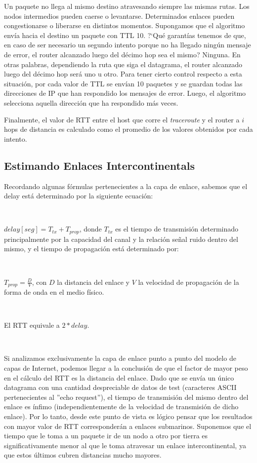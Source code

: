 Un paquete no llega al mismo destino atravesando siempre las mismas rutas. Los nodos intermedios pueden
caerse o levantarse. Determinados enlaces pueden congestionarse o liberarse en distintos momentos.
Supongamos que el algoritmo env\'ia hacia el destino un paquete con TTL 10. ?`Qu\'e garant\'ias tenemos de que,
en caso de ser necesario un segundo intento porque no ha llegado ning\'un mensaje de error, el router
alcanzado luego del d\'ecimo hop sea el mismo? Ninguna. En otras palabras, dependiendo la ruta que siga
el datagrama, el router alcanzado luego del d\'ecimo hop ser\'a uno u otro.
Para tener cierto control respecto a esta situaci\'on, por cada valor de TTL se env\'ian 10 paquetes y
se guardan todas las direcciones de IP que han respondido los mensajes de error.
Luego, el algoritmo selecciona aquella direcci\'on que ha respondido m\'as veces.

Finalmente, el valor de RTT entre el host que corre el \emph{traceroute} y el router a $i$ hops de
distancia es calculado como el promedio de los valores obtenidos por cada intento.


\subsection{Estimando Enlaces Intercontinentals}

Recordando algunas f\'ormulas pertenecientes a la capa de enlace, sabemos que el delay est\'a determinado
por la siguiente ecuaci\'on:

~

$delay[seg] = T_{tx} + T_{prop}$, donde $T_{tx}$ es el tiempo de transmisi\'on determinado principalmente
por la capacidad del canal y la relaci\'on se\~nal ruido dentro del mismo, y el tiempo de propagaci\'on
est\'a determinado por:

~

$T_{prop} = \frac{D}{V}$, con $D$ la distancia del enlace y $V$ la velocidad de propagaci\'on de la forma
de onda en el medio f\'isico.

~

El RTT equivale a $2*delay$.

~

Si analizamos exclusivamente la capa de enlace punto a punto del modelo de capas de Internet, podemos
llegar a la conclusi\'on de que el factor de mayor peso en el c\'alculo del RTT es la distancia del enlace.
Dado que se env\'ia un \'unico datagrama con una cantidad despreciable de datos de test (caracteres
ASCII pertenecientes al ''echo request''), el tiempo de transmisi\'on del mismo dentro del enlace es
\'infimo (independientemente de la velocidad de transmisi\'on de dicho enlace). Por lo tanto, desde este
punto de vista es l\'ogico pensar que los resultados con mayor valor de RTT corresponder\'an a enlaces
submarinos. Suponemos que el tiempo que le toma a un paquete ir de un nodo a otro
por tierra es significativamente menor al que le toma atravesar un
enlace intercontinental, ya que estos \'ultimos cubren distancias mucho mayores.

